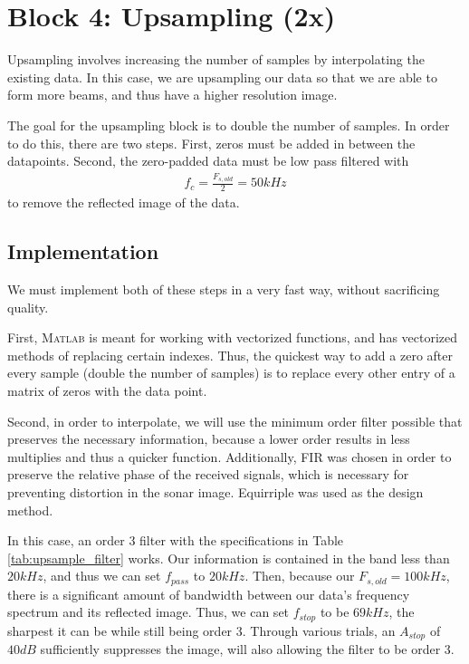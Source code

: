 
\section{Block 4: Upsampling (2x)}

Upsampling involves increasing the number of samples by interpolating the existing data.  In this case, we are upsampling our data so that we are able to form more beams, and thus have a higher resolution image.

The goal for the upsampling block is to double the number of samples.  In order to do this, there are two steps.  First, zeros must be added in between the datapoints.  Second, the zero-padded data must be low pass filtered with 
\begin{align*}
    f_c = \frac{F_{s,old}}{2} = 50 \unit{kHz}
\end{align*}
to remove the reflected image of the data.

\subsection{Implementation}

We must implement both of these steps in a very fast way, without sacrificing quality.

First, \textsc{Matlab} is meant for working with vectorized functions, and has vectorized methods of replacing certain indexes.  Thus, the quickest way to add a zero after every sample (double the number of samples) is to replace every other entry of a matrix of zeros with the data point.

Second, in order to interpolate, we will use the minimum order filter possible that preserves the necessary information, because a lower order results in less multiplies and thus a quicker function.  Additionally, FIR was chosen in order to preserve the relative phase of the received signals, which is necessary for preventing distortion in the sonar image.  Equirriple was used as the design method.

In this case, an order 3 filter with the specifications in Table \ref{tab:upsample_filter} works.  Our information is contained in the band less than $20 \unit{kHz}$, and thus we can set $f_{pass}$ to $20 \unit{kHz}$.  Then, because our $F_{s,old} = 100 \unit{kHz}$, there is a significant amount of bandwidth between our data's frequency spectrum and its reflected image.  Thus, we can set $f_{stop}$ to be $69 \unit{kHz}$, the sharpest it can be while still being order 3.  Through various trials, an $A_{stop}$ of $40 \unit{dB}$ sufficiently suppresses the image, will also allowing the filter to be order 3.

